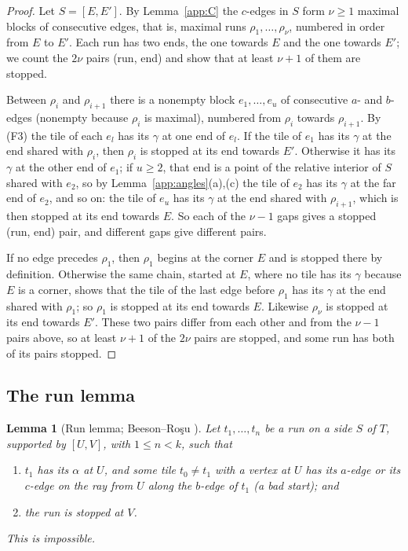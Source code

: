 \documentclass[11pt]{amsart}
\newtheorem{lemma}[theorem]{Lemma}
\theoremstyle{remark}
\begin{document}
\begin{proof}
Let $S=[E,E']$. By Lemma~\ref{app:C} the $c$-edges in $S$ form $\nu\ge1$ maximal blocks of consecutive edges, that is, maximal runs $\rho_1,\dots,\rho_\nu$, numbered in order from $E$ to $E'$. Each run has two ends, the one towards $E$ and the one towards $E'$; we count the $2\nu$ pairs (run, end) and show that at least $\nu+1$ of them are stopped.

Between $\rho_i$ and $\rho_{i+1}$ there is a nonempty block $e_1,\dots,e_u$ of consecutive $a$- and $b$-edges (nonempty because $\rho_i$ is maximal), numbered from $\rho_i$ towards $\rho_{i+1}$. By (F3) the tile of each $e_l$ has its $\gamma$ at one end of $e_l$. If the tile of $e_1$ has its $\gamma$ at the end shared with $\rho_i$, then $\rho_i$ is stopped at its end towards $E'$. Otherwise it has its $\gamma$ at the other end of $e_1$; if $u\ge2$, that end is a point of the relative interior of $S$ shared with $e_2$, so by Lemma~\ref{app:angles}(a),(c) the tile of $e_2$ has its $\gamma$ at the far end of $e_2$, and so on: the tile of $e_u$ has its $\gamma$ at the end shared with $\rho_{i+1}$, which is then stopped at its end towards $E$. So each of the $\nu-1$ gaps gives a stopped (run, end) pair, and different gaps give different pairs.

If no edge precedes $\rho_1$, then $\rho_1$ begins at the corner $E$ and is stopped there by definition. Otherwise the same chain, started at $E$, where no tile has its $\gamma$ because $E$ is a corner, shows that the tile of the last edge before $\rho_1$ has its $\gamma$ at the end shared with $\rho_1$; so $\rho_1$ is stopped at its end towards $E$. Likewise $\rho_\nu$ is stopped at its end towards $E'$. These two pairs differ from each other and from the $\nu-1$ pairs above, so at least $\nu+1$ of the $2\nu$ pairs are stopped, and some run has both of its pairs stopped.
\end{proof}

\subsection{The run lemma}

\begin{lemma}[Run lemma; Beeson--Ro\c{s}u {\cite[Lemmas~32 and~33]{BR}}]\label{app:run}
Let $t_1,\dots,t_n$ be a run on a side $S$ of $T$, supported by $[U,V]$, with $1\le n<k$, such that
\begin{enumerate}
\item[(R1)] $t_1$ has its $\alpha$ at $U$, and some tile $t_0\ne t_1$ with a vertex at $U$ has its $a$-edge or its $c$-edge on the ray from $U$ along the $b$-edge of $t_1$ \textup{(}a \emph{bad start}\textup{)}; and
\item[(R2)] the run is stopped at $V$.
\end{enumerate}
This is impossible.
\end{lemma}
\end{document}
